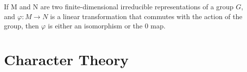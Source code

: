 \begin{theorem}
    If M and N are two finite-dimensional irreducible representations of a group $G$, and $\varphi:M \to N$ is a 
    linear transformation that commutes with the action of the group, then $\varphi$ is either an isomorphism or 
    the $0$ map.
\end{theorem}



            



\section{Character Theory}






